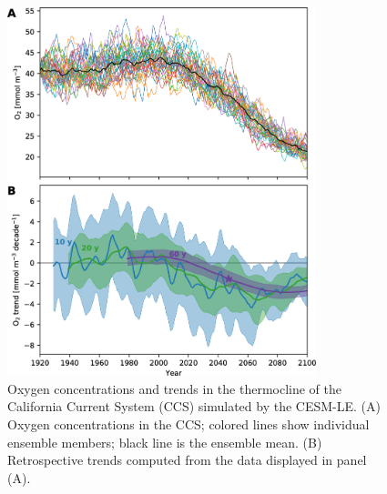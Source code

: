 \documentclass{report_chapter}
\begin{document}
\begin{figure}[tbp]
\centering
\includegraphics[width=0.8\textwidth]{cesm-regional-ccs-timeseries.png}
\caption{Oxygen concentrations and trends in the thermocline of the California Current System (CCS) simulated by the CESM-LE.
(A) Oxygen concentrations in the CCS; colored lines show individual ensemble members; black line is the ensemble mean.
(B) Retrospective trends computed from the data displayed in panel (A).}
\label{fig:ccs}
\end{figure}
\end{document}
